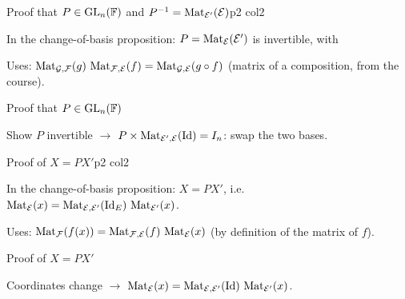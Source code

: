 \documentclass[sheet,noautoquant,noautokw]{neyvia-study}
\begin{document}
\begin{concept}[1.55]{Proof that $P\in\mathrm{GL}_n(\mathbb{F})$ and $P^{-1}=\operatorname{Mat}_{\mathcal E'}(\mathcal E)$}{p2 col2}
\begin{definition}
\noindent In the change-of-basis proposition: $P=\operatorname{Mat}_{\mathcal E}(\mathcal E')$ is invertible, with
\par\noindent Uses: $\operatorname{Mat}_{\mathcal G,\mathcal F}(g)\,\operatorname{Mat}_{\mathcal F,\mathcal E}(f)=\operatorname{Mat}_{\mathcal G,\mathcal E}(g\circ f)$ (matrix of a composition, from the course).
\end{definition}
\begin{method}{Proof that $P\in\mathrm{GL}_n(\mathbb{F})$}
\end{method}
\begin{reflex}
Show $P$ invertible \ensuremath{\rightarrow} $P\times\operatorname{Mat}_{\mathcal E',\mathcal E}(\mathrm{Id})=I_n$: swap the two bases.
\end{reflex}
\end{concept}
\begin{concept}[1.56]{Proof of $X=PX'$}{p2 col2}
\begin{definition}
\noindent In the change-of-basis proposition: $X=PX'$, i.e. $\operatorname{Mat}_{\mathcal E}(x)=\operatorname{Mat}_{\mathcal E,\mathcal E'}(\mathrm{Id}_E)\,\operatorname{Mat}_{\mathcal E'}(x)$.
\par\noindent Uses: $\operatorname{Mat}_{\mathcal F}(f(x))=\operatorname{Mat}_{\mathcal F,\mathcal E}(f)\,\operatorname{Mat}_{\mathcal E}(x)$ (by definition of the matrix of $f$).
\end{definition}
\begin{method}{Proof of $X=PX'$}
\end{method}
\begin{reflex}
Coordinates change \ensuremath{\rightarrow} $\operatorname{Mat}_{\mathcal E}(x)=\operatorname{Mat}_{\mathcal E,\mathcal E'}(\mathrm{Id})\,\operatorname{Mat}_{\mathcal E'}(x)$.
\end{reflex}
\end{concept}
\end{document}
